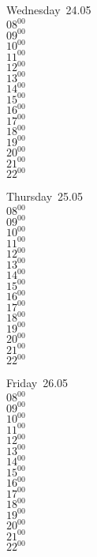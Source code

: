 \documentclass[11pt,a4paper]{book}\usepackage[]{graphicx}\usepackage[]{color}
\begin{document}
\begin{weekdaybox}
  Wednesday~24.05\\
  { 
  \vfill
  $08^{00}$\\
$09^{00}$\\
$10^{00}$\\
$11^{00}$\\
$12^{00}$\\
$13^{00}$\\
$14^{00}$\\
$15^{00}$\\
$16^{00}$\\
$17^{00}$\\
$18^{00}$\\
$19^{00}$\\
$20^{00}$\\
$21^{00}$\\
$22^{00}$\\
  }
\end{weekdaybox}
\clearpage
\begin{headerbox}
\end{headerbox}
\begin{weekdaybox}
  Thursday~25.05\\
  { 
  \vfill
  $08^{00}$\\
$09^{00}$\\
$10^{00}$\\
$11^{00}$\\
$12^{00}$\\
$13^{00}$\\
$14^{00}$\\
$15^{00}$\\
$16^{00}$\\
$17^{00}$\\
$18^{00}$\\
$19^{00}$\\
$20^{00}$\\
$21^{00}$\\
$22^{00}$\\
  }
\end{weekdaybox} 
\begin{weekdaybox}
  Friday~26.05\\
  { 
  \vfill
  $08^{00}$\\
$09^{00}$\\
$10^{00}$\\
$11^{00}$\\
$12^{00}$\\
$13^{00}$\\
$14^{00}$\\
$15^{00}$\\
$16^{00}$\\
$17^{00}$\\
$18^{00}$\\
$19^{00}$\\
$20^{00}$\\
$21^{00}$\\
$22^{00}$\\
  }
\end{weekdaybox}
\end{document}
